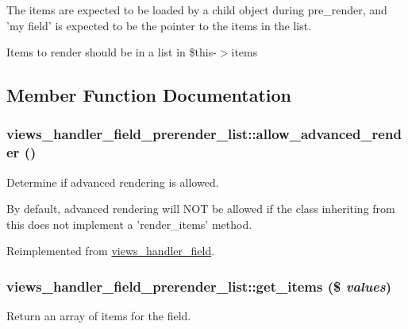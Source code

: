 The items are expected to be loaded by a child object during pre\_\-render, and 'my field' is expected to be the pointer to the items in the list.

Items to render should be in a list in \$this-$>$items 

\subsection{Member Function Documentation}
\hypertarget{classviews__handler__field__prerender__list_341b000d2b0e13c3819e47165ca33ec9}{
\subsubsection[{allow\_\-advanced\_\-render}]{\setlength{\rightskip}{0pt plus 5cm}views\_\-handler\_\-field\_\-prerender\_\-list::allow\_\-advanced\_\-render ()}}
\label{classviews__handler__field__prerender__list_341b000d2b0e13c3819e47165ca33ec9}


Determine if advanced rendering is allowed.

By default, advanced rendering will NOT be allowed if the class inheriting from this does not implement a 'render\_\-items' method. 

Reimplemented from \hyperlink{classviews__handler__field_cdeb45612be43c2d58814726b35e55aa}{views\_\-handler\_\-field}.\hypertarget{classviews__handler__field__prerender__list_69ff2ab99e152c72dc16bdcb4610c2f0}{
\subsubsection[{get\_\-items}]{\setlength{\rightskip}{0pt plus 5cm}views\_\-handler\_\-field\_\-prerender\_\-list::get\_\-items (\$ {\em values})}}
\label{classviews__handler__field__prerender__list_69ff2ab99e152c72dc16bdcb4610c2f0}


Return an array of items for the field.

